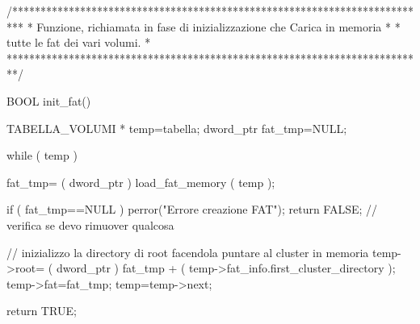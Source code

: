 /**************************************************************************
 * Funzione, richiamata in fase di inizializzazione che Carica in memoria *
 * tutte le fat dei vari volumi.					  *
 **************************************************************************/

BOOL init_fat() {

    TABELLA_VOLUMI * temp=tabella;
    dword_ptr  fat_tmp=NULL;

   while ( temp ) {

        fat_tmp= ( dword_ptr ) load_fat_memory ( temp );

        if ( fat_tmp==NULL ) { 
	    perror("Errore creazione FAT"); 
            return FALSE;  // verifica se devo rimuover qualcosa
	}

        // inizializzo la directory di root facendola puntare al cluster in memoria
        temp->root= ( dword_ptr ) fat_tmp + ( temp->fat_info.first_cluster_directory );
        temp->fat=fat_tmp;
        temp=temp->next;

     }

    return TRUE;

}



